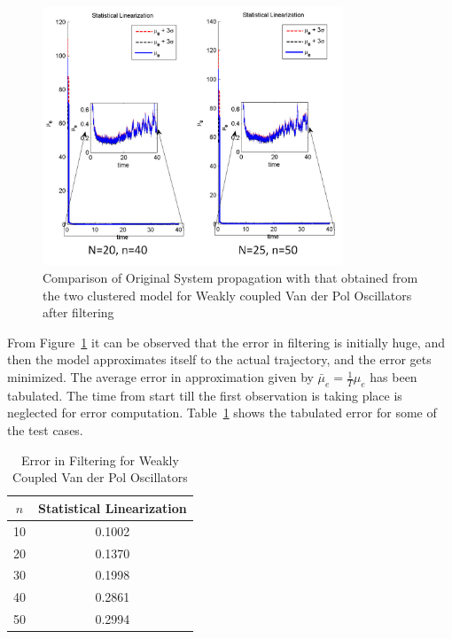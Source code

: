 \begin{figure}
\begin{center}
\includegraphics[width=0.8\textwidth]{figures/FIG_14}
\caption{Comparison of Original System propagation with that obtained from the two clustered model for Weakly coupled Van der Pol Oscillators after filtering}
\label{vanderpolhdcoup_clust_filter}
\end{center}
\end{figure}

From Figure~\ref{vanderpolhdcoup_clust_filter} it can be observed that the error in filtering is initially huge, and then the model approximates itself to the actual trajectory, and the error gets minimized. The average error in approximation given by $\bar{\mu}_e = \frac{1}{T}\mu_e$ has been tabulated. The time from start till the first observation is taking place is neglected for error computation. Table~\ref{vanderpolhdfilter} shows the tabulated error for some of the test cases. 

\begin{table}[H]
\scriptsize{
\begin{center}
\caption{Error in Filtering for Weakly Coupled Van der Pol Oscillators}
\label{vanderpolhdfilter}
\begin{tabular}{|c|c|}
\hline
$n$ & Statistical Linearization  \\ \hline
10    & 0.1002 \\ \hline
    20    & 0.1370 \\ \hline
    30    & 0.1998 \\ \hline
    40    & 0.2861 \\ \hline
    50    & 0.2994 \\ \hline
\end{tabular}
\end{center}
} 
\end{table}

